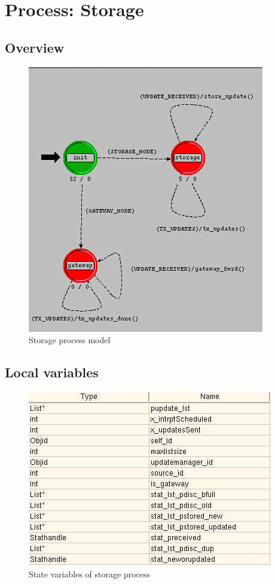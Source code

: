 
\section{Process: Storage}

\subsection{Overview}
\begin{figure}[ht]
    \centering
    \includegraphics[scale=0.5]{images/p_storage}
    \caption{Storage process model}
    \label{fig:appendix-b}
\end{figure}

\subsection{Local variables}
\begin{figure}[h]
    \centering
    \includegraphics[width=.7\textwidth]{images/state_variable_storage}
    \caption{State variables of storage process}
    \label{fig:appendix-b_sv}
\end{figure}

